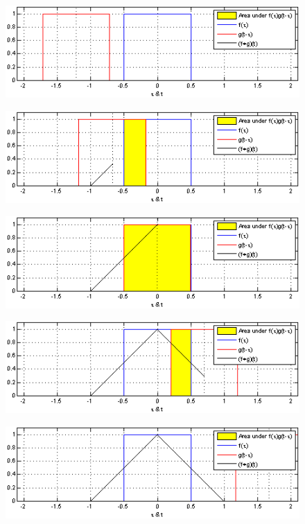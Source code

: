 \documentclass[12pt]{article}
\begin{document}
\begin{figure}[H]{}
    \centering
    \includegraphics[scale=1.8]{../images/conv1.png}
\end{figure}
\begin{figure}[H]{}
    \centering
    \includegraphics[scale=1.8]{../images/conv2.png}
\end{figure}
\begin{figure}[H]{}
    \centering
    \includegraphics[scale=1.8]{../images/conv3.png}
\end{figure}
\begin{figure}[H]{}
    \centering
    \includegraphics[scale=1.8]{../images/conv4.png}
\end{figure}
\begin{figure}[H]{}
    \centering
    \includegraphics[scale=1.8]{../images/conv5.png}
\end{figure}
\end{document}
